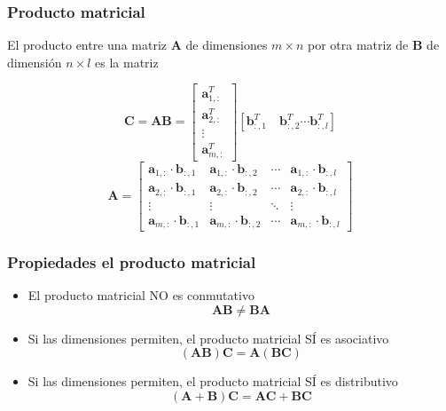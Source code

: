 \documentclass{beamer}
\begin{document}
\begin{frame}
\frametitle{Producto matricial}
El producto entre una matriz $\boldsymbol{A}$ de dimensiones $m \times n$ por otra matriz de $\boldsymbol{B}$ de dimensión $n\times l$ es la matriz 

 
\begin{equation*}
\boldsymbol{C}= \boldsymbol{AB}= \begin{bmatrix} \boldsymbol{a}_{1,:}^T  \\ \boldsymbol{a}_{2,:}^T  \\ \vdots \\ \boldsymbol{a}_{m,:}^T   \end{bmatrix}[\boldsymbol{b}_{:,1}^T \hspace{1em} \boldsymbol{b}_{:,2}^T \cdots \boldsymbol{b}_{:,l}^T ]
\end{equation*}
\begin{equation*}
\boldsymbol{A} = \begin{bmatrix} \boldsymbol{a}_{1,:} \cdot \boldsymbol{b}_{:,1}  & \boldsymbol{a}_{1,:} \cdot \boldsymbol{b}_{:,2}  &  \cdots & \boldsymbol{a}_{1,:} \cdot \boldsymbol{b}_{:,l} \\   \boldsymbol{a}_{2,:} \cdot \boldsymbol{b}_{:,1}  & \boldsymbol{a}_{2,:} \cdot \boldsymbol{b}_{:,2}  &  \cdots & \boldsymbol{a}_{2,:} \cdot \boldsymbol{b}_{:,l}  \\ \vdots  & \vdots   & \ddots &  \vdots  \\   \boldsymbol{a}_{m,:} \cdot \boldsymbol{b}_{:,1}  & \boldsymbol{a}_{m,:} \cdot \boldsymbol{b}_{:,2}  &  \cdots & \boldsymbol{a}_{m,:} \cdot \boldsymbol{b}_{:,l} \end{bmatrix}
\end{equation*}
\end{frame}
\begin{frame}
\frametitle{Propiedades el producto matricial}
\begin{itemize}
\item El producto matricial NO es conmutativo 
\begin{equation*}
\boldsymbol{AB} \neq \boldsymbol{BA}
\end{equation*}
\item Si las dimensiones permiten, el producto matricial SÍ es asociativo 
\begin{equation*}
(\boldsymbol{AB})\boldsymbol{C} = \boldsymbol{A}(\boldsymbol{BC})
\end{equation*}
\item Si las dimensiones permiten, el producto matricial SÍ es distributivo
\begin{equation*}
(\boldsymbol{A}+\boldsymbol{B})\boldsymbol{C} = \boldsymbol{A}\boldsymbol{C}+ \boldsymbol{B}\boldsymbol{C}
\end{equation*}
\end{itemize}
\end{frame}
\end{document}

